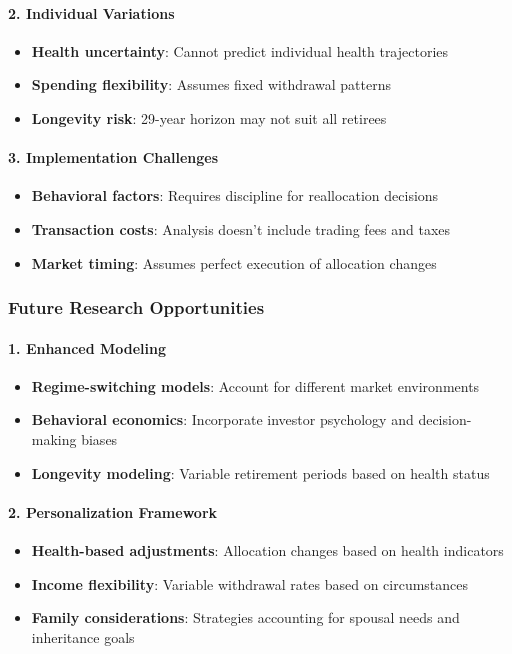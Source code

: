 \documentclass[11pt,letterpaper]{article}
\begin{document}
\paragraph{2. Individual Variations}
\begin{itemize}
\item \textbf{Health uncertainty}: Cannot predict individual health trajectories
\item \textbf{Spending flexibility}: Assumes fixed withdrawal patterns
\item \textbf{Longevity risk}: 29-year horizon may not suit all retirees
\end{itemize}

\paragraph{3. Implementation Challenges}
\begin{itemize}
\item \textbf{Behavioral factors}: Requires discipline for reallocation decisions
\item \textbf{Transaction costs}: Analysis doesn't include trading fees and taxes
\item \textbf{Market timing}: Assumes perfect execution of allocation changes
\end{itemize}

\subsubsection{Future Research Opportunities}

\paragraph{1. Enhanced Modeling}
\begin{itemize}
\item \textbf{Regime-switching models}: Account for different market environments
\item \textbf{Behavioral economics}: Incorporate investor psychology and decision-making biases
\item \textbf{Longevity modeling}: Variable retirement periods based on health status
\end{itemize}

\paragraph{2. Personalization Framework}
\begin{itemize}
\item \textbf{Health-based adjustments}: Allocation changes based on health indicators
\item \textbf{Income flexibility}: Variable withdrawal rates based on circumstances
\item \textbf{Family considerations}: Strategies accounting for spousal needs and inheritance goals
\end{itemize}
\end{document}
